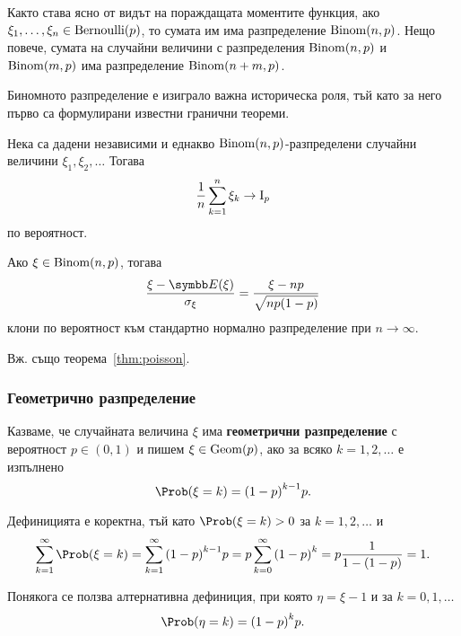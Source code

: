 \documentclass[numbers=endperiod, bibliography=totocnumbered]{scrartcl}
\begin{document}
Както става ясно от видът на пораждащата моментите функция, ако \( \xi_1, \ldots, \xi_n \in \operatorname{Bernoulli}(p) \), то сумата им има разпределение \( \operatorname{Binom}(n, p) \). Нещо повече, сумата на случайни величини с разпределения \( \operatorname{Binom}(n, p) \) и \( \operatorname{Binom}(m, p) \) има разпределение \( \operatorname{Binom}(n + m, p) \).

Биномното разпределение е изиграло важна историческа роля, тъй като за него първо са формулирани известни гранични теореми.

\begin{theorem}\label{thm:bernoulli}
  Нека са дадени независими и еднакво \( \operatorname{Binom}(n, p) \)-разпределени случайни величини \( \xi_1, \xi_2, \ldots \) Тогава
  \begin{equation*}
    \frac 1 n \sum_{k=1}^n \xi_k
    \to
    \operatorname{I}_p
  \end{equation*}
  по вероятност.
\end{theorem}

\begin{theorem}\label{thm:moivre_laplace}
  Ако \( \xi \in \operatorname{Binom}(n, p) \), тогава
  \begin{equation*}
    \frac {\xi - \Expect(\xi)} {\sigma_\xi}
    =
    \frac {\xi - np} {\sqrt{np(1-p)}}
  \end{equation*}
  клони по вероятност към стандартно нормално разпределение при \( n \to \infty \).
\end{theorem}

Вж. също теорема~\ref{thm:poisson}.

\subsubsection{Геометрично разпределение}\label{dist:geom}

\begin{definition}
  Казваме, че случайната величина \( \xi \) има \textbf{геометрични разпределение} с вероятност \( p \in (0, 1) \) и пишем \( \xi \in \operatorname{Geom}(p) \), ако за всяко \( k = 1, 2, \ldots \) е изпълнено
  \begin{equation*}
    \Prob(\xi = k) = {(1-p)}^{k-1} p.
  \end{equation*}

  Дефиницията е коректна, тъй като \( \Prob(\xi = k) > 0 \) за \( k = 1, 2, \ldots \) и
  \begin{equation*}
    \sum_{k=1}^\infty \Prob(\xi = k)
    =
    \sum_{k=1}^\infty {(1-p)}^{k-1} p
    =
    p \sum_{k=0}^\infty {(1-p)}^k
    =
    p \frac 1 {1-(1-p)}
    =
    1.
  \end{equation*}

  Понякога се ползва алтернативна дефиниция, при която \( \eta = \xi - 1 \) и за \( k = 0, 1, \ldots \)
  \begin{equation*}
    \Prob(\eta = k) = {(1-p)}^k p.
  \end{equation*}
\end{definition}
\end{document}
